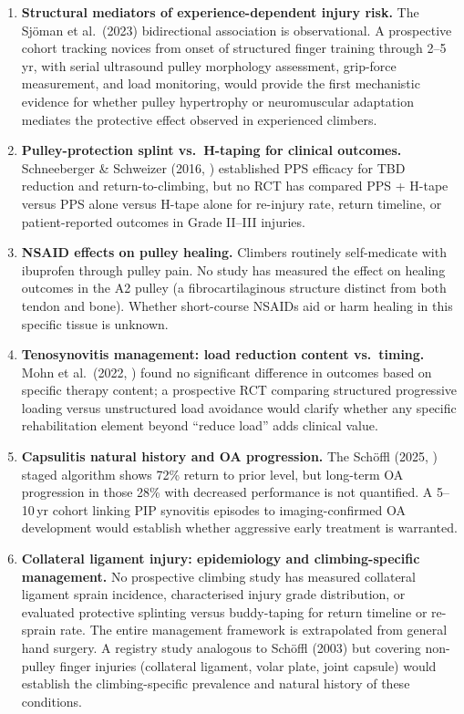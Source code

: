 \begin{enumerate}[leftmargin=2em]
  \item \textbf{Structural mediators of experience-dependent injury risk.} The Sjöman et al.\ (2023) bidirectional association is observational. A prospective cohort tracking novices from onset of structured finger training through 2--5\,yr, with serial ultrasound pulley morphology assessment, grip-force measurement, and load monitoring, would provide the first mechanistic evidence for whether pulley hypertrophy or neuromuscular adaptation mediates the protective effect observed in experienced climbers.

  \item \textbf{Pulley-protection splint vs.\ H-taping for clinical outcomes.} Schneeberger \& Schweizer (2016, \cite{SS16}) established PPS efficacy for TBD reduction and return-to-climbing, but no RCT has compared PPS + H-tape versus PPS alone versus H-tape alone for re-injury rate, return timeline, or patient-reported outcomes in Grade II--III injuries.

  \item \textbf{NSAID effects on pulley healing.} Climbers routinely self-medicate with ibuprofen through pulley pain. No study has measured the effect on healing outcomes in the A2 pulley (a fibrocartilaginous structure distinct from both tendon and bone). Whether short-course NSAIDs aid or harm healing in this specific tissue is unknown.

  \item \textbf{Tenosynovitis management: load reduction content vs.\ timing.} Mohn et al.\ (2022, \cite{MSM+22}) found no significant difference in outcomes based on specific therapy content; a prospective RCT comparing structured progressive loading versus unstructured load avoidance would clarify whether any specific rehabilitation element beyond ``reduce load'' adds clinical value.

  \item \textbf{Capsulitis natural history and OA progression.} The Sch\"{o}ffl (2025, \cite{SLL+25}) staged algorithm shows 72\% return to prior level, but long-term OA progression in those 28\% with decreased performance is not quantified. A 5--10\,yr cohort linking PIP synovitis episodes to imaging-confirmed OA development would establish whether aggressive early treatment is warranted.

  \item \textbf{Collateral ligament injury: epidemiology and climbing-specific management.} No prospective climbing study has measured collateral ligament sprain incidence, characterised injury grade distribution, or evaluated protective splinting versus buddy-taping for return timeline or re-sprain rate. The entire management framework is extrapolated from general hand surgery. A registry study analogous to Sch\"{o}ffl (2003) but covering non-pulley finger injuries (collateral ligament, volar plate, joint capsule) would establish the climbing-specific prevalence and natural history of these conditions.
\end{enumerate}
